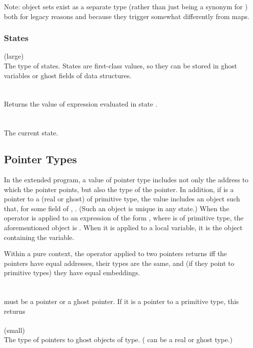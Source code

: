 \documentclass[preprint,nocopyrightspace]{sigplanconf}
\begin{document}
{Note: object sets exist as a separate type (rather than just being a
synonym for \vcc{\bool[\object]}) both for legacy reasons and because
they trigger somewhat differently from maps.

\subsubsection{States}

\vcc{\state} (large)\\
The type of states. States are first-class values, so they can be
stored in ghost variables or ghost fields of data structures. 
\\\\
\\
Returns the value of expression  evaluated in state . 
\\\\
\vcc{\state \now()}\\
The current state. 

\subsection{Pointer Types}
In the extended program, a value  of pointer type includes not only the
address  to which the pointer points, but also the type of the
pointer. In addition, if  is a pointer to a (real or ghost)
\vcc{\object} of primitive type, 
the value includes an object  such that, for some
field  of , . 
(Such an object is unique in any \vcc{\good} state.)
When the \vcc{&} operator is applied to an expression of the
form , where  is of primitive type, the
aforementioned object is . When it is applied to a local
variable, it is the object containing the variable.

Within a pure context, the operator \vcc{==} applied to two pointers
returns \vcc{\true} iff the pointers have equal addresses, their types
are the same, and (if they point to primitive types) they have equal
embeddings. 
\\\\
\\
 must be a pointer or a ghost pointer. If it is a pointer to a
primitive type, this returns 
\\\\
 (small)\\
The type of pointers to ghost objects of type. ( can be a real or ghost type.)

}
\end{document}
